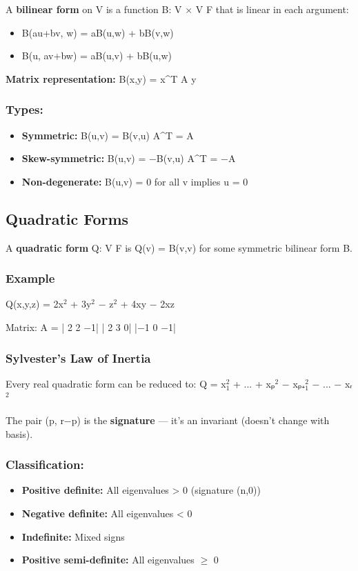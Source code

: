 \documentclass[12pt,a4paper,openany]{book}
\begin{document}
{{A \textbf{bilinear form} on V is a function B: V $\times$ V  F that is linear in each argument:
\begin{itemize}[leftmargin=*]
  \item B(au+bv, w) = aB(u,w) + bB(v,w)
  \item B(u, av+bw) = aB(u,v) + bB(u,w)
\end{itemize}

\textbf{Matrix representation:} B(x,y) = x^T A y

\subsubsection{Types:}
\begin{itemize}[leftmargin=*]
  \item \textbf{Symmetric:} B(u,v) = B(v,u)  A^T = A
  \item \textbf{Skew-symmetric:} B(u,v) = −B(v,u)  A^T = −A
  \item \textbf{Non-degenerate:} B(u,v) = 0 for all v implies u = 0
\end{itemize}

\subsection{Quadratic Forms }

A \textbf{quadratic form} Q: V  F is Q(v) = B(v,v) for some symmetric bilinear form B.

\subsubsection{Example}
Q(x,y,z) = 2x$^2$ + 3y$^2$ − z$^2$ + 4xy − 2xz

Matrix: A = | 2   2  −1|
            | 2   3   0|
            |−1   0  −1|

\subsubsection{Sylvester's Law of Inertia }
Every real quadratic form can be reduced to: Q = x$_1^2$ + ... + xₚ$^2$ − xₚ₊$_1^2$ − ... − xᵣ$^2$

The pair (p, r−p) is the \textbf{signature} — it's an invariant (doesn't change with basis).

\subsubsection{Classification:}
\begin{itemize}[leftmargin=*]
  \item \textbf{Positive definite:} All eigenvalues > 0 (signature (n,0))
  \item \textbf{Negative definite:} All eigenvalues < 0
  \item \textbf{Indefinite:} Mixed signs
  \item \textbf{Positive semi-definite:} All eigenvalues $\geq$ 0
\end{itemize}

}}
\end{document}
